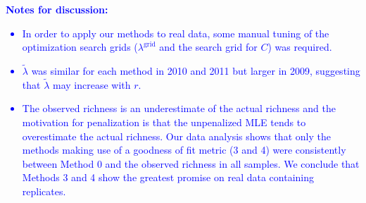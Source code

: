 \documentclass[12pt]{article}
\newcommand{\lambdagrid}{\lambda^{\text{grid}}}
\theoremstyle{break}
\theoremstyle{break}
\begin{document}
\noindent \textcolor{blue}{\textbf{Notes for discussion:} 
\begin{itemize}
\item In order to apply our methods to real data, some manual tuning of the optimization search grids ($\lambdagrid$ and the search grid for $C$) was required.
\item $\widetilde{\lambda}$ was similar for each method in 2010 and 2011 but larger in 2009, suggesting that $\widetilde{\lambda}$ may increase with $r$.
\item The observed richness is an underestimate of the actual richness and the motivation for penalization is that the unpenalized MLE tends to overestimate the actual richness.  Our data analysis shows that only the methods making use of a goodness of fit metric (3 and 4) were consistently between Method 0 and the observed richness in all samples.  We conclude that Methods 3 and 4 show the greatest promise on real data containing replicates.
\end{itemize}}
\end{document}
